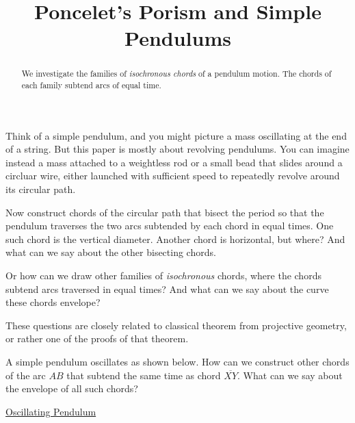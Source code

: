 \documentclass{ximera}
\title{Poncelet's Porism and Simple Pendulums}
\begin{document}
\begin{abstract}
We investigate the families of \emph{isochronous chords} of a pendulum motion. The chords of each family subtend arcs of equal time.
\end{abstract}
\maketitle

Think of a simple pendulum, and you might picture a mass oscillating at the end of a string. But this paper is mostly about revolving pendulums. You can imagine instead a mass attached to a weightless rod or a small bead that slides around a circluar wire, either launched with sufficient speed to repeatedly revolve around its circular path. 

Now construct chords of the circular path that bisect the period so that the pendulum traverses the two arcs subtended by each chord in equal times. One such chord is the vertical diameter. Another chord is horizontal, but where? And what can we say about the other bisecting chords.

Or how can we draw other families of \emph{isochronous} chords, where the chords subtend arcs traversed in equal times?  And what can we say about the curve these chords envelope?


These questions are closely related to classical theorem from projective geometry, or rather one of the proofs of that theorem.



\begin{exploration}
A simple pendulum oscillates as shown below. How can we construct other chords of the arc $AB$ that subtend the same time as chord $\overline{XY}$. What can we say about the envelope of all such chords?

\begin{onlineOnly}
    \begin{center}
\end{center}
\end{onlineOnly}

\href{https://www.desmos.com/calculator/pleca0vkjw}{Oscillating Pendulum}

\end{exploration}
\end{document}
